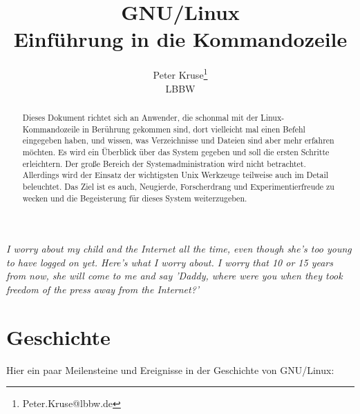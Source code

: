\documentclass[titlepage,a4paper]{article}
\begin{document}
\hypersetup{pageanchor=false}
\title{GNU/Linux\\Einführung in die Kommandozeile}
\author{Peter Kruse\thanks{Peter.Kruse@lbbw.de}\\LBBW}
\maketitle

\thispagestyle{empty}
\vspace*{\fill}
\emph{I worry about my child and the Internet all the time, even though
she's too young to have logged on yet.  Here's what I worry about. I
worry that 10 or 15 years from now, she will come to me and say
'Daddy, where were you when they took freedom of the press away from
the Internet?'}

\vspace*{\fill}

\begin{abstract}
Dieses Dokument richtet sich an
Anwender, die schonmal mit der Linux-Kom\-man\-do\-zei\-le in Be\-rüh\-rung gekommen sind,
dort vielleicht mal einen Befehl eingegeben haben, und wissen,
was Verzeichnisse und Dateien sind aber mehr erfahren möchten.
Es wird ein Überblick über das System gegeben und soll die
ersten Schritte erleichtern.  Der große Bereich der Systemadministration wird
nicht betrachtet.  Allerdings wird der Einsatz der wichtigsten Unix Werkzeuge
teilweise auch im Detail beleuchtet.  Das Ziel ist es auch, Neugierde,
Forscherdrang und Experimentierfreude zu wecken und die Begeisterung für
dieses System weiterzugeben. 
\end{abstract}

\hypersetup{pageanchor=true}
\tableofcontents
\newpage

\pagestyle{fancy}
\section{Geschichte}

Hier ein paar Meilensteine und Ereignisse in der Geschichte von GNU/Linux:
\end{document}
